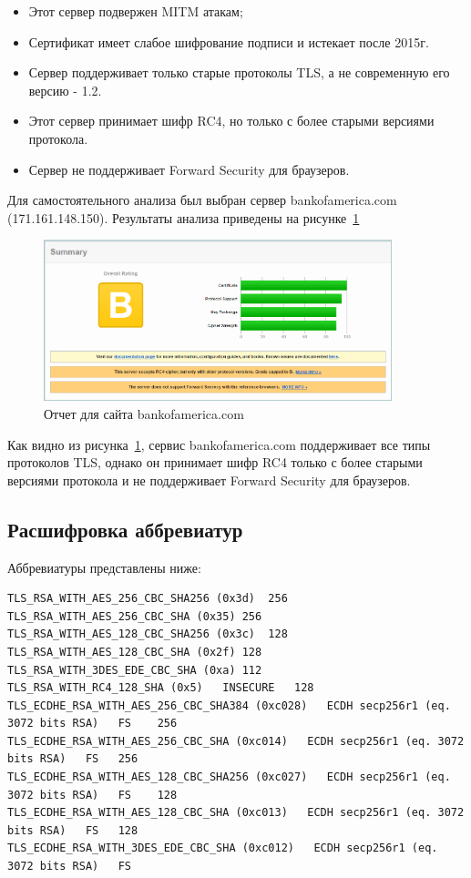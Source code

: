 \documentclass[10pt,a4paper]{report}
\begin{document}
			\begin{itemize}
				\item Этот сервер подвержен MITM атакам;
				\item Сертификат имеет слабое шифрование подписи и истекает после 2015г.
				\item Сервер поддерживает только старые протоколы TLS, а не современную его версию - 1.2.
				\item Этот сервер принимает шифр RC4, но только с более старыми версиями протокола.
				\item Сервер не поддерживает Forward Security для браузеров.
			\end{itemize}
			
			Для самостоятельного анализа был выбран сервер bankofamerica.com (171.161.148.150).
			Результаты анализа приведены на рисунке~\ref{ris:site3}

			\begin{figure}[h]
				\centering
				\includegraphics[width=0.9\textwidth]{imgs/3.png}
				\caption{Отчет для сайта bankofamerica.com }
				\label{ris:site3}
			\end{figure}
		
			Как видно из рисунка~\ref{ris:site3}, сервис bankofamerica.com  поддерживает все 
			типы протоколов TLS, однако он принимает шифр RC4 только с более старыми версиями протокола и не поддерживает Forward Security для браузеров.
			
		\subsection{Расшифровка аббревиатур}
			Аббревиатуры представлены ниже:
			\begin{lstlisting}
TLS_RSA_WITH_AES_256_CBC_SHA256 (0x3d)	256
TLS_RSA_WITH_AES_256_CBC_SHA (0x35)	256
TLS_RSA_WITH_AES_128_CBC_SHA256 (0x3c)	128
TLS_RSA_WITH_AES_128_CBC_SHA (0x2f)	128
TLS_RSA_WITH_3DES_EDE_CBC_SHA (0xa)	112
TLS_RSA_WITH_RC4_128_SHA (0x5)   INSECURE	128
TLS_ECDHE_RSA_WITH_AES_256_CBC_SHA384 (0xc028)   ECDH secp256r1 (eq. 3072 bits RSA)   FS	256
TLS_ECDHE_RSA_WITH_AES_256_CBC_SHA (0xc014)   ECDH secp256r1 (eq. 3072 bits RSA)   FS	256
TLS_ECDHE_RSA_WITH_AES_128_CBC_SHA256 (0xc027)   ECDH secp256r1 (eq. 3072 bits RSA)   FS	128
TLS_ECDHE_RSA_WITH_AES_128_CBC_SHA (0xc013)   ECDH secp256r1 (eq. 3072 bits RSA)   FS	128
TLS_ECDHE_RSA_WITH_3DES_EDE_CBC_SHA (0xc012)   ECDH secp256r1 (eq. 3072 bits RSA)   FS
			\end{lstlisting}
			
\end{document}
